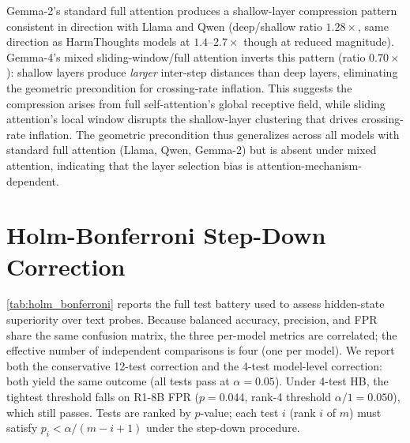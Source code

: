\begin{table}[h]
\centering
\small
\caption{Cross-architecture cosine compression. Deep/shallow ratio ${>}1$ indicates shallow-layer compression (the geometric precondition for crossing-rate inflation). Standard full attention consistently shows compression; Gemma-4's mixed sliding/full attention does not. $^a$\,Probe-selected layers from HarmThoughts (L2 vs.\ L14). $^b$\,Range-based windows (first 15\% vs.\ last 25\% of layers) due to insufficient jailbreak samples for probe-based selection.}
\label{tab:gemma_compression}
\end{table}

Gemma-2's standard full attention produces a shallow-layer compression pattern consistent in direction with Llama and Qwen (deep/shallow ratio $1.28\times$, same direction as HarmThoughts models at $1.4$--$2.7\times$ though at reduced magnitude). Gemma-4's mixed sliding-window/full attention inverts this pattern (ratio $0.70\times$): shallow layers produce \emph{larger} inter-step distances than deep layers, eliminating the geometric precondition for crossing-rate inflation. This suggests the compression arises from full self-attention's global receptive field, while sliding attention's local window disrupts the shallow-layer clustering that drives crossing-rate inflation. The geometric precondition thus generalizes across all models with standard full attention (Llama, Qwen, Gemma-2) but is absent under mixed attention, indicating that the layer selection bias is attention-mechanism-dependent.

\section{Holm-Bonferroni Step-Down Correction}
\label{app:holm_bonferroni}

\cref{tab:holm_bonferroni} reports the full test battery used to assess hidden-state superiority over text probes. Because balanced accuracy, precision, and FPR share the same confusion matrix, the three per-model metrics are correlated; the effective number of independent comparisons is four (one per model). We report both the conservative 12-test correction and the 4-test model-level correction: both yield the same outcome (all tests pass at $\alpha{=}0.05$). Under 4-test HB, the tightest threshold falls on R1-8B FPR ($p{=}0.044$, rank-4 threshold $\alpha/1{=}0.050$), which still passes. Tests are ranked by $p$-value; each test $i$ (rank $i$ of $m$) must satisfy $p_i < \alpha / (m - i + 1)$ under the step-down procedure.

